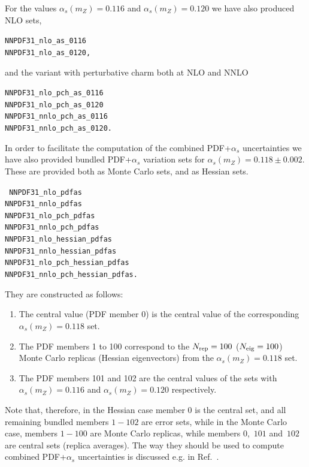 \begin{itemize}
For the values $\alpha_s(m_Z)=0.116$ and $\alpha_s(m_Z)=0.120$ we have
also produced  NLO sets, 
\begin{flushleft}
  \tt NNPDF31\_nlo\_as\_0116 \\
  \tt NNPDF31\_nlo\_as\_0120, \\
\end{flushleft}
and the  variant with perturbative charm both at NLO and NNLO
\begin{flushleft}
  \tt NNPDF31\_nlo\_pch\_as\_0116 \\
  \tt NNPDF31\_nlo\_pch\_as\_0120 \\
\tt NNPDF31\_nnlo\_pch\_as\_0116\\
\tt NNPDF31\_nnlo\_pch\_as\_0120.\\
\end{flushleft}


In order to facilitate the computation of the combined PDF+$\alpha_s$
uncertainties we have also provided bundled  PDF+$\alpha_s$ variation
sets for $\alpha_s(m_Z)=0.118\pm0.002$. These are
provided both as Monte Carlo sets, and as Hessian sets. 
\begin{flushleft}
  \tt
NNPDF31\_nlo\_pdfas	\\
NNPDF31\_nnlo\_pdfas	\\
NNPDF31\_nlo\_pch\_pdfas \\	
NNPDF31\_nnlo\_pch\_pdfas  \\	
NNPDF31\_nlo\_hessian\_pdfas \\
NNPDF31\_nnlo\_hessian\_pdfas \\	
NNPDF31\_nlo\_pch\_hessian\_pdfas \\	
NNPDF31\_nnlo\_pch\_hessian\_pdfas. \\
\end{flushleft}
They are constructed as follows:
\begin{enumerate}
\item The central value (PDF member 0) is the central
  value of the corresponding $\alpha_s(m_Z)=0.118$ set.
\item The PDF members 1 to 100 correspond to the
  $N_{\mathrm{rep}}=100$ ($N_{\rm eig}=100$) Monte Carlo replicas
  (Hessian eigenvectors) from the $\alpha_s(m_Z)=0.118$ set.
\item The PDF members 101 and 102 are the central values
  of the sets with $\alpha_s(m_Z)=0.116$ and $\alpha_s(m_Z)=0.120$
  respectively.
\end{enumerate}
Note that, therefore, in the Hessian case member 0 is the central set,
and all remaining  bundled members $1-102$ are error sets, while in the Monte
Carlo case,  members $1-100$ are Monte Carlo replicas, while members
0,~$101$ and~$102$ are central sets (replica averages). The way they
should be used to compute combined PDF+$\alpha_s$ uncertainties is
discussed e.g. in Ref.~\cite{Butterworth:2015oua}.



\end{itemize}
